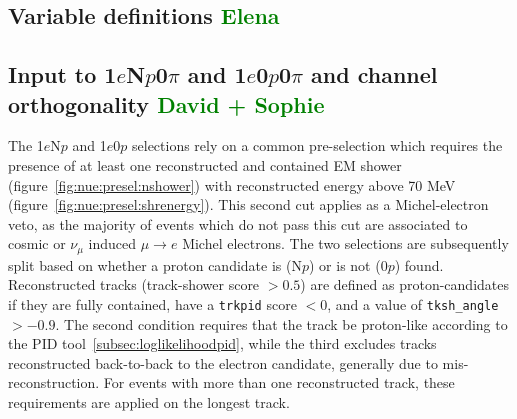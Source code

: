 \documentclass[a4paper]{article}
\newcommand{\npsel}{1$e$N$p$0$\pi$ }
\newcommand{\zpsel}{1$e$0$p$0$\pi$ }
\begin{document}
\subsection{Variable definitions \textcolor{green}{Elena}}
\label{sec:nueselection:variables}

\clearpage

\subsection{Input to \npsel and \zpsel and channel orthogonality \textcolor{green}{David + Sophie} }
\label{sec:nueselection:inputs}

The 1$e$N$p$ and 1$e$0$p$ selections rely on a common pre-selection which requires the presence of at least one reconstructed and contained EM shower (figure~\ref{fig:nue:presel:nshower}) with reconstructed energy above 70 MeV (figure~\ref{fig:nue:presel:shrenergy}). This second cut applies as a Michel-electron veto, as the majority of events which do not pass this cut are associated to cosmic or $\nu_{\mu}$ induced $\mu \rightarrow e$ Michel electrons. The two selections are subsequently split based on whether a proton candidate is (N$p$) or is not (0$p$) found. Reconstructed tracks (track-shower score $> 0.5$) are defined as proton-candidates if they are fully contained,  have a \texttt{trkpid} score $< 0$, and a value of \texttt{tksh\_angle} $> -0.9$. The second condition requires that the track be proton-like according to the PID tool~\ref{subsec:loglikelihoodpid}, while the third excludes tracks reconstructed back-to-back to the electron candidate, generally due to mis-reconstruction. For events with more than one reconstructed track, these requirements are applied on the longest track.
\end{document}
